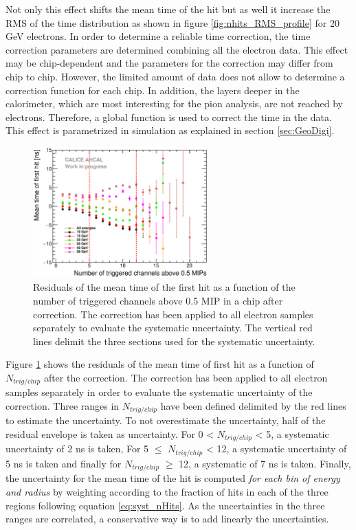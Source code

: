 \documentclass{JINST}
\begin{document}
Not only this effect shifts the mean time of the hit but as well it increase the RMS of the time distribution as shown in figure \ref{fig:nhits_RMS_profile} for 20 GeV electrons. In order to determine a reliable time correction, the time correction parameters are determined combining all the electron data. This effect may be chip-dependent and the parameters for the correction may differ from chip to chip. However, the limited amount of data does not allow to determine a correction function for each chip. In addition, the layers deeper in the calorimeter, which are most interesting for the pion analysis, are not reached by electrons. Therefore, a global function is used to correct
the time in the data. This effect is parametrized in simulation as explained in section \ref{sec:GeoDigi}.

\begin{figure}[htbp!]
  \centering
  \includegraphics[width=0.6\textwidth]{fig/CheckCorrection.eps}
  \caption{Residuals of the mean time of the first hit as a function of the number of triggered channels above 0.5 MIP in a chip after correction. The correction has been applied to all electron samples separately to evaluate the systematic uncertainty. The vertical red lines delimit the three sections used for the systematic uncertainty.}
  \label{fig:Nhit_residuals}
\end{figure}

Figure \ref{fig:Nhit_residuals} shows the residuals of the mean time of first hit as a function of $N_{trig/chip}$ after the correction. The correction has been applied to all electron samples separately in order to evaluate the systematic uncertainty of the correction. Three ranges in $N_{trig/chip}$ have been defined delimited by the red lines to estimate the uncertainty. To not overestimate the uncertainty, half of the residual envelope is taken as uncertainty. For 0 < $N_{trig/chip}$ < 5, a systematic uncertainty of 2 ns is taken, For 5 $\leq$ $N_{trig/chip}$ < 12, a systematic uncertainty of 5 ns is taken and finally for $N_{trig/chip}$ $\geq$ 12, a systematic of 7 ns is taken. Finally, the uncertainty for the mean time of the hit is computed \textit{for each bin of energy and radius} by weighting according to the fraction of hits in each of the three regions following equation \ref{eq:syst_nHits}. As the uncertainties in the three ranges are correlated, a conservative way is to add linearly the uncertainties.
\end{document}
